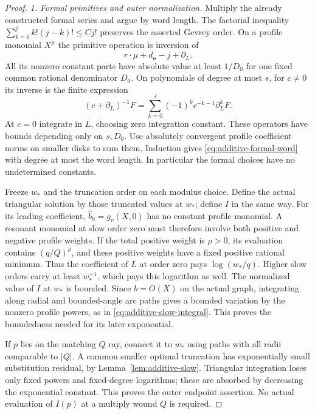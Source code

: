 \begin{proof}
\emph{1. Formal primitives and outer normalization.}
Multiply the already constructed formal series and argue by word
length.  The factorial inequality
$\sum_{k=0}^j k!(j-k)!\le Cj!$ preserves the asserted Gevrey order.
On a profile monomial $X^\mu$ the primitive operation is inversion of
\begin{equation}\label{eq:additive-resonance-operator}
 r\cdot\mu+d_{\mathbf e}-j+\partial_L.
\end{equation}
All its nonzero constant parts have absolute value at least $1/D_0$
for one fixed common rational denominator $D_0$.  On polynomials of
degree at most $s$, for $c\ne0$ its inverse is the finite expression
\[
 (c+\partial_L)^{-1}F
       =\sum_{k=0}^{s}(-1)^kc^{-k-1}\partial_L^kF.
\]
At $c=0$ integrate in $L$, choosing zero integration constant.  These
operators have bounds depending only on $s,D_0$.  Use absolutely
convergent profile coefficient norms on smaller disks to sum them.
Induction gives \eqref{eq:additive-formal-word} with degree at most
the word length.  In particular the formal choices have no undetermined
constants.

Freeze $w_*$ and the truncation order on each modulus choice.  Define
the actual triangular solution by those truncated values at $w_*$;
define $I$ in the same way.  For its leading coefficient,
$\widehat b_0=g_v(X,0)$ has no constant profile monomial.  A resonant
monomial at slow order zero must therefore involve both positive and
negative profile weights.  If the total positive weight is $\rho>0$,
its evaluation contains $(q/Q)^\rho$, and these positive weights have
a fixed positive rational minimum.  Thus the coefficient of $L$ at
order zero pays $\log(w_*/q)$.  Higher slow orders carry at least
$w_*^{-1}$, which pays this logarithm as well.  The normalized value of
$I$ at $w_*$ is bounded.  Since $b=O(X)$ on the actual graph, integrating
along radial and bounded-angle arc paths gives a bounded variation by
the nonzero profile powers, as in \eqref{eq:additive-slow-integral}.
This proves the boundedness needed for its later exponential.

If $p$ lies on the matching $Q$ ray, connect it to $w_*$ using paths with
all radii comparable to $|Q|$.  A common smaller optimal truncation
has exponentially small substitution residual, by
Lemma~\ref{lem:additive-slow}.  Triangular integration loses only fixed
powers and fixed-degree logarithms; these are absorbed by decreasing
the exponential constant.  This proves the outer endpoint assertion.
No actual evaluation of $I(p)$ at a multiply wound $Q$ is required.


\end{proof}
